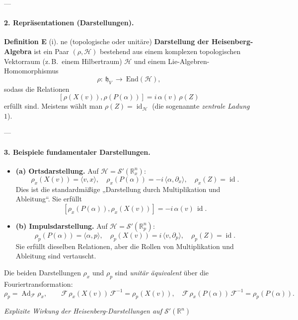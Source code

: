 \documentclass[10pt, letterpaper]{article}
\newcommand{\id}{\operatorname{id}}
\newcommand{\Ad}{\operatorname{Ad}}
\newcommand{\R}{\mathbb{R}}
\newcommand{\End}{\mathrm{End}}
\newcommand{\CustomHeading}[3]{%
  \par\medskip\noindent%
  \textbf{#1 #2} \textnormal{(#3)}.\enskip%
}
\newenvironment{DEF}[2]{\begin{unitbox}\CustomHeading{Definition}{#1}{#2}}{\end{unitbox}}
\begin{document}
---

\paragraph{2. Repräsentationen (Darstellungen).}

\begin{DEF}
Eine (topologische oder unitäre) \textbf{Darstellung der Heisenberg-Algebra}
ist ein Paar $(\rho,\mathcal{H})$ bestehend aus einem komplexen topologischen
Vektorraum (z.\,B.\ einem Hilbertraum) $\mathcal{H}$ und einem Lie-Algebren-Homomorphismus
\[
\rho:\ \mathfrak{h}_V\ \longrightarrow\ \End(\mathcal{H}),
\]
sodass die Relationen
\[
[\rho(X(v)),\rho(P(\alpha))]=i\,\alpha(v)\,\rho(Z)
\]
erfüllt sind. Meistens wählt man $\rho(Z)=\id_\mathcal{H}$ (die sogenannte \emph{zentrale Ladung} $1$).
\end{DEF}

---

\paragraph{3. Beispiele fundamentaler Darstellungen.}

\begin{itemize}
\item \textbf{(a) Ortsdarstellung.}  
Auf $\mathcal{H}=\mathcal{S}'(\R^n_x)$:
\[
\rho_x(X(v)) = \langle v,x\rangle,\quad
\rho_x(P(\alpha)) = -i\,\langle \alpha,\partial_x\rangle,\quad
\rho_x(Z)=\id.
\]
Dies ist die standardmäßige „Darstellung durch Multiplikation und Ableitung“.
Sie erfüllt
\[
[\rho_x(P(\alpha)),\rho_x(X(v))]=-i\,\alpha(v)\,\id.
\]

\item \textbf{(b) Impulsdarstellung.}  
Auf $\mathcal{H}=\mathcal{S}'(\R^n_p)$:
\[
\rho_p(P(\alpha))=\langle \alpha,p\rangle,\quad
\rho_p(X(v))=i\,\langle v,\partial_p\rangle,\quad
\rho_p(Z)=\id.
\]
Sie erfüllt dieselben Relationen, aber die Rollen von Multiplikation und Ableitung sind vertauscht.
\end{itemize}

Die beiden Darstellungen $\rho_x$ und $\rho_p$ sind \emph{unitär äquivalent}
über die Fouriertransformation:
\[
\rho_p = \Ad_{\mathcal{F}}\rho_x,\qquad
\mathcal{F}\,\rho_x(X(v))\,\mathcal{F}^{-1}=\rho_p(X(v)),\quad
\mathcal{F}\,\rho_x(P(\alpha))\,\mathcal{F}^{-1}=\rho_p(P(\alpha)).
\]


\emph{Explizite Wirkung der Heisenberg-Darstellungen auf $\mathcal{S}'(\R^n)$}
\end{document}
